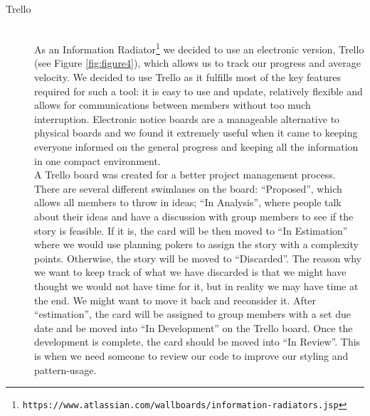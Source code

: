 \documentclass[11pt, a4paper]{article}
\begin{document}
\begin{description}
  \item[Trello] \hfill \\
As an Information Radiator\footnote{\tt{https://www.atlassian.com/wallboards/information-radiators.jsp}} we decided to use an electronic version, Trello (see Figure \ref{fig:figure4}), which allows us to track our progress and average velocity. We decided to use Trello as it fulfills most of the key features required for such a tool: it is easy to use and update, relatively flexible and allows for communications between members without too much interruption. Electronic notice boards are a manageable alternative to physical boards and we found it extremely useful when it came to keeping everyone informed on the general progress and keeping all the information in one compact environment. \\
A Trello board was created for a better project management process. There are several different swimlanes on the board: ``Proposed'', which allows all members to throw in ideas; ``In Analysis'', where people talk about their ideas and have a discussion with group members to see if the story is feasible. If it is, the card will be then moved to ``In Estimation'' where we would use planning pokers to assign the story with a complexity points. Otherwise, the story will be moved to ``Discarded''. The reason why we want to keep track of what we have discarded is that we might have thought we would not have time for it, but in reality we may have time at the end. We might want to move it back and reconsider it. After ``estimation'', the card will be assigned to group members with a set due date and be moved into ``In Development'' on the Trello board. Once the development is complete, the card should be moved into ``In Review''. This is when we need someone to review our code to improve our styling and pattern-usage.  


\end{description}
\end{document}
